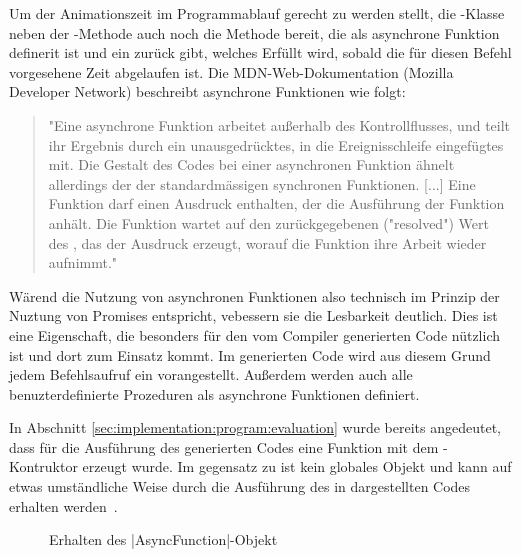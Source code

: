 Um der Animationszeit im Programmablauf gerecht zu werden stellt, die -Klasse neben der -Methode auch noch die Methode  bereit, die als asynchrone Funktion definerit ist und ein  zurück gibt, welches Erfüllt wird, sobald die für diesen Befehl vorgesehene Zeit abgelaufen ist. Die MDN-Web-Dokumentation (Mozilla Developer Network) beschreibt asynchrone Funktionen wie folgt:

\begin{quote}
  "Eine asynchrone Funktion arbeitet außerhalb des Kontrollflusses, und teilt ihr Ergebnis durch ein unausgedrücktes, in die Ereignisschleife eingefügtes  mit. Die Gestalt des Codes bei einer asynchronen Funktion ähnelt allerdings der der standardmässigen synchronen Funktionen. [...] Eine  Funktion darf einen  Ausdruck enthalten, der die Ausführung der Funktion anhält. Die Funktion wartet auf den zurückgegebenen ("resolved") Wert des , das der  Ausdruck erzeugt, worauf die Funktion ihre Arbeit wieder aufnimmt."~\cite{mdn-async-function}
\end{quote}

Wärend die Nutzung von asynchronen Funktionen also technisch im Prinzip der Nuztung von Promises entspricht, vebessern sie die Lesbarkeit deutlich. Dies ist eine Eigenschaft, die besonders für den vom Compiler generierten Code  nützlich ist und dort zum Einsatz kommt. Im generierten Code wird aus diesem Grund jedem Befehlsaufruf ein  vorangestellt. Außerdem werden auch alle benuzterdefinierte Prozeduren als asynchrone Funktionen definiert.

In Abschnitt \ref{sec:implementation:program:evaluation} wurde bereits angedeutet, dass für die Ausführung des generierten Codes eine Funktion mit dem -Kontruktor erzeugt wurde. Im gegensatz zu  ist  kein globales Objekt und kann auf etwas umständliche Weise durch die Ausführung des in  dargestellten Codes erhalten werden~\cite{mdn-async-constructor}.


\begin{figure}
  
  \caption{Erhalten des \inlinec|AsyncFunction|-Objekt~\cite{mdn-async-constructor}}
  \label{fig:implementation:rendering:animation:async-function}
\end{figure}

